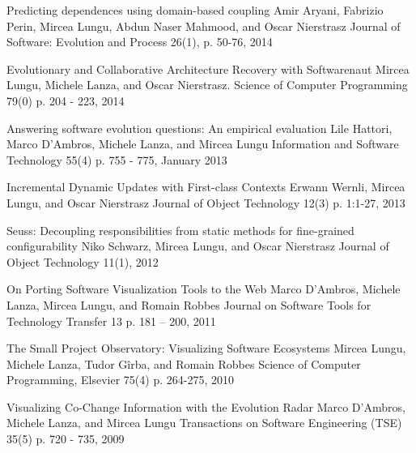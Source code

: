 
\begin{enumerate}

\paper
	{Predicting dependences using domain-based coupling}
	{Amir Aryani, Fabrizio Perin, Mircea Lungu, Abdun Naser Mahmood, and Oscar Nierstrasz}
	{Journal of Software: Evolution and Process 26(1), p. 50-76, 2014}

\paper 
	{Evolutionary and Collaborative Architecture Recovery with Softwarenaut}
	{Mircea Lungu, Michele Lanza, and Oscar Nierstrasz.}
	{Science of Computer Programming 79(0) p. 204 - 223, 2014}

\paper 
	{Answering software evolution questions: An empirical evaluation}
	{Lile Hattori, Marco D'Ambros, Michele Lanza, and Mircea Lungu}
	{Information and Software Technology 55(4) p. 755 - 775, January 2013}

\paper 
	{Incremental Dynamic Updates with First-class Contexts}
	{Erwann Wernli, Mircea Lungu, and Oscar Nierstrasz}
	{Journal of Object Technology 12(3) p. 1:1-27, 2013}

\paper
	{Seuss: Decoupling responsibilities from static methods for fine-grained configurability}
	{Niko Schwarz, Mircea Lungu, and Oscar Nierstrasz}
	{Journal of Object Technology 11(1), 2012}

\paper 
	{On Porting Software Visualization Tools to the Web}
	{Marco D'Ambros, Michele Lanza, Mircea Lungu, and Romain Robbes}
	{Journal on Software Tools for Technology Transfer 13 p. 181 -- 200, 2011}

\paper 
	{The Small Project Observatory: Visualizing Software Ecosystems}
	{Mircea Lungu, Michele Lanza, Tudor G\^irba, and Romain Robbes}
	{Science of Computer Programming, Elsevier 75(4) p. 264-275, 2010}

\paper 
	{Visualizing Co-Change Information with the Evolution Radar}
	{Marco D'Ambros, Michele Lanza, and Mircea Lungu}
	{Transactions on Software Engineering (TSE) 35(5) p. 720 - 735, 2009}

\end{enumerate}




